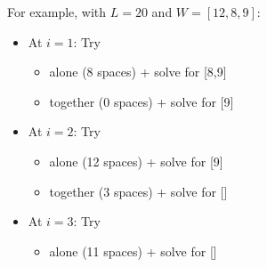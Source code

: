   \begin{example}
    \label{ex:recursive-brute-force-line-breaking}
    For example, with $L=20$ and $W=[12,8,9]$:
    \begin{itemize}
      \item At $i=1$: Try
        \begin{itemize}
          \item [12] alone (8 spaces) + solve for [8,9]
          \item [12,8] together (0 spaces) + solve for [9]
        \end{itemize}
      \item At $i=2$: Try
        \begin{itemize}
          \item [8] alone (12 spaces) + solve for [9]
          \item [8,9] together (3 spaces) + solve for []
        \end{itemize}
      \item At $i=3$: Try
        \begin{itemize}
          \item [9] alone (11 spaces) + solve for []
        \end{itemize}
    \end{itemize}
  \end{example}

